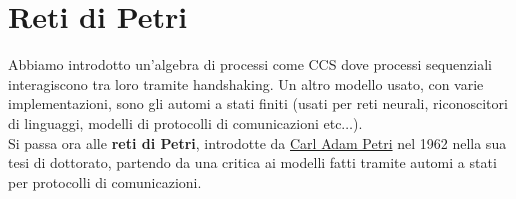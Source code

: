 \chapter{Reti di Petri}
\label{Capitolo 5}


Abbiamo introdotto un'algebra di processi come CCS dove processi sequenziali
interagiscono tra loro tramite handshaking. Un altro modello usato, con varie
implementazioni, sono gli automi a stati finiti (usati per reti neurali,
riconoscitori di linguaggi, modelli di protocolli di comunicazioni
etc$\ldots$).\\
Si passa ora alle \textbf{reti di Petri}, introdotte da \href{https://it.wikipedia.org/wiki/Carl_Adam_Petri}{Carl Adam Petri} nel 1962 nella sua
tesi di dottorato, partendo da una critica ai modelli fatti tramite automi a
stati per protocolli di comunicazioni.\\

